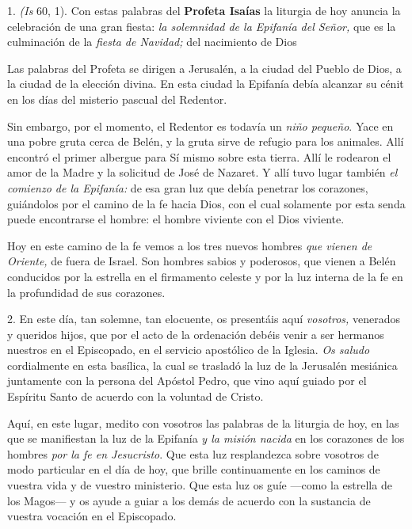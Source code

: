 				
				\begin{body}
					1.  \emph{(Is} 60, 1). Con estas palabras del \textbf{Profeta Isaías} la liturgia de hoy anuncia la celebración de una gran fiesta: \emph{la solemnidad de la Epifanía del Señor,} que es la culminación de la \emph{fiesta de Navidad;} del nacimiento de Dios
					
					Las palabras del Profeta se dirigen a Jerusalén, a la ciudad del Pueblo de Dios, a la ciudad de la elección divina. En esta ciudad la Epifanía debía alcanzar su cénit en los días del misterio pascual del Redentor.
					
					Sin embargo, por el momento, el Redentor es todavía un \emph{niño pequeño}. Yace en una pobre gruta cerca de Belén, y la gruta sirve de refugio para los animales. Allí encontró el primer albergue para Sí mismo sobre esta tierra. Allí le rodearon el amor de la Madre y la solicitud de José de Nazaret. Y allí tuvo lugar también \emph{el comienzo de la Epifanía:} de esa gran luz que debía penetrar los corazones, guiándolos por el camino de la fe hacia Dios, con el cual solamente por esta senda puede encontrarse el hombre: el hombre viviente con el Dios viviente.
					
					Hoy en este camino de la fe vemos a los tres nuevos hombres \emph{que vienen de Oriente,} de fuera de Israel. Son hombres sabios y poderosos, que vienen a Belén conducidos por la estrella en el firmamento celeste y por la luz interna de la fe en la profundidad de sus corazones.
					
					2. En este día, tan solemne, tan elocuente, os presentáis aquí \emph{vosotros,} venerados y queridos hijos, que por el acto de la ordenación debéis venir a ser hermanos nuestros en el Episcopado, en el servicio apostólico de la Iglesia. \emph{Os saludo} cordialmente en esta basílica, la cual se trasladó la luz de la Jerusalén mesiánica juntamente con la persona del Apóstol Pedro, que vino aquí guiado por el Espíritu Santo de acuerdo con la voluntad de Cristo.
					
					Aquí, en este lugar, medito con vosotros las palabras de la liturgia de hoy, en las que se manifiestan la luz de la Epifanía \emph{y la misión nacida} en los corazones de los hombres \emph{por la fe en Jesucristo}. Que esta luz resplandezca sobre vosotros de modo particular en el día de hoy, que brille continuamente en los caminos de vuestra vida y de vuestro ministerio. Que esta luz os guíe ---como la estrella de los Magos--- y os ayude a guiar a los demás de acuerdo con la sustancia de vuestra vocación en el Episcopado.
					

\end{body}
